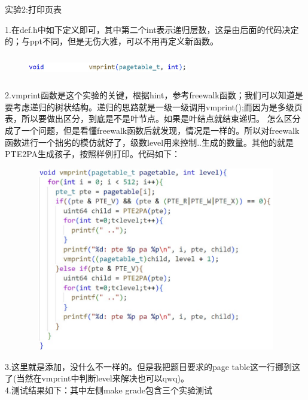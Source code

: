 \documentclass[12pt]{article}
\begin{document}
\begin{Large}
	\noindent 实验2:打印页表\par
\end{Large}
1.在def.h中如下定义即可，其中第二个int表示递归层数，这是由后面的代码决定的；与ppt不同，但是无伤大雅，可以不用再定义新函数。
\newpage
\begin{figure}[h]
	\centering
	\includegraphics[height=1cm,width=7cm]{lab3-7.jpg}
\end{figure}
2.vmprint函数是这个实验的关键，根据hint，参考freewalk函数；我们可以知道是要考虑递归的树状结构。递归的思路就是一级一级调用vmprint();而因为是多级页表，所以要做出区分，到底是不是叶节点。如果是叶结点就结束递归。
怎么区分成了一个问题，但是看懂freewalk函数后就发现，情况是一样的。所以对freewalk函数进行一个拙劣的模仿就好了，级数level用来控制..生成的数量。其他的就是PTE2PA生成孩子，按照样例打印。代码如下：
\begin{figure}[h]
	\centering
	\includegraphics[height=8cm,width=11.25cm]{lab3-8.jpg}
\end{figure}\par
3.这里就是添加，没什么不一样的。但是我把题目要求的page table这一行挪到这了(当然在vmprint中判断level来解决也可以qwq)。\\
\hspace*{2em}4.测试结果如下：其中左侧make grade包含三个实验测试
\end{document}
